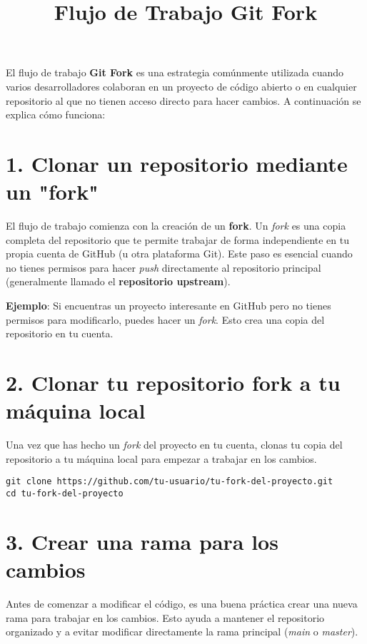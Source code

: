 \documentclass{article}
\title{Flujo de Trabajo Git Fork}
\author{}
\date{}
\begin{document}
\maketitle

El flujo de trabajo \textbf{Git Fork} es una estrategia comúnmente utilizada cuando varios desarrolladores colaboran en un proyecto de código abierto o en cualquier repositorio al que no tienen acceso directo para hacer cambios. A continuación se explica cómo funciona:

\section{1. Clonar un repositorio mediante un "fork"}

El flujo de trabajo comienza con la creación de un \textbf{fork}. Un \textit{fork} es una copia completa del repositorio que te permite trabajar de forma independiente en tu propia cuenta de GitHub (u otra plataforma Git). Este paso es esencial cuando no tienes permisos para hacer \textit{push} directamente al repositorio principal (generalmente llamado el \textbf{repositorio upstream}).

\noindent
\textbf{Ejemplo}: Si encuentras un proyecto interesante en GitHub pero no tienes permisos para modificarlo, puedes hacer un \textit{fork}. Esto crea una copia del repositorio en tu cuenta.

\section{2. Clonar tu repositorio fork a tu máquina local}

Una vez que has hecho un \textit{fork} del proyecto en tu cuenta, clonas tu copia del repositorio a tu máquina local para empezar a trabajar en los cambios.

\begin{verbatim}
git clone https://github.com/tu-usuario/tu-fork-del-proyecto.git
cd tu-fork-del-proyecto
\end{verbatim}

\section{3. Crear una rama para los cambios}

Antes de comenzar a modificar el código, es una buena práctica crear una nueva rama para trabajar en los cambios. Esto ayuda a mantener el repositorio organizado y a evitar modificar directamente la rama principal (\textit{main} o \textit{master}).
\end{document}

